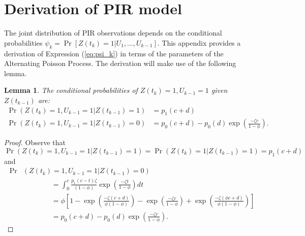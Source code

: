 \documentclass[man, noextraspace, floatsintext]{apa6}\usepackage[]{graphicx}\usepackage[]{color}
\newcommand{\bibfile}{Behavioral_observation-APP}
\newtheorem{lemma}{Lemma}
\begin{document}


 
\appendix

\section{Derivation of PIR model}
\label{app:PIR_derivation}

The joint distribution of PIR observations depends on the conditional probabilities $\psi_k = \Pr\left[ Z(t_k) = 1 \left| U_1,...,U_{k-1}\right.\right]$. 
This appendix provides a derivation of Expression (\ref{eq:psi_k}) in terms of the parameters of the Alternating Poisson Process. The derivation will make use of the following lemma.

\begin{lemma}
\label{lemma1}
The conditional probabilities of $Z(t_k) = 1, U_{k-1} = 1$ given $Z(t_{k-1})$ are:
\begin{align*}
\Pr\left(Z(t_k) = 1, U_{k-1} = 1 \left| Z(t_{k-1}) = 1 \right.\right) &= p_1(c + d) \\
\Pr\left(Z(t_k) = 1, U_{k-1} = 1 \left| Z(t_{k-1}) = 0 \right.\right) &= p_0(c + d) - p_0(d) \exp\left(\frac{- \zeta c}{1 - \phi}\right).
\end{align*}
\end{lemma}

\begin{proof}
Observe that \[
\Pr\left(Z(t_k) = 1, U_{k-1} = 1 \left| Z(t_{k-1}) = 1 \right.\right) = \Pr\left(Z(t_k) = 1 \left| Z(t_{k-1}) = 1 \right.\right) = p_1(c + d) \]
and \begin{align*}
\Pr &\left(Z(t_k) = 1, U_{k-1} = 1 \left| Z(t_{k-1}) = 0 \right.\right) \\
& \qquad \qquad = \int_0^c\frac{p_1(c - t) \zeta}{(1 - \phi)}\exp\left(\frac{-\zeta t}{1 - \phi}\right) dt \\
& \qquad \qquad  = \phi \left[ 1 - \exp\left(\frac{- \zeta (c + d)}{\phi(1 - \phi)}\right) - \exp\left(\frac{- \zeta c}{1 - \phi}\right) + \exp\left(\frac{- \zeta (\phi c + d)}{\phi(1 - \phi)}\right)\right] \\
& \qquad \qquad = p_0(c + d) - p_0(d) \exp\left(\frac{- \zeta c}{1 - \phi}\right).
\end{align*}
\end{proof}
\end{document}
